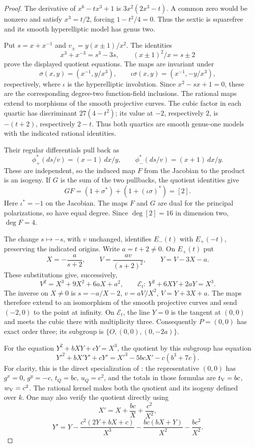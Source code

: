 \documentclass[11pt]{article}
\theoremstyle{definition}
\theoremstyle{remark}
\begin{document}
\begin{proof}
The derivative of \(x^6-tx^3+1\) is \(3x^2(2x^3-t)\).
A common zero would be nonzero and satisfy \(x^3=t/2\), forcing
\(1-t^2/4=0\). Thus the sextic is squarefree and its smooth
hyperelliptic model has genus two.

Put \(s=x+x^{-1}\) and \(v_\pm=y(x\pm1)/x^2\).
The identities
\[
 x^3+x^{-3}=s^3-3s,\qquad (x\pm1)^2/x=s\pm2
\]
prove the displayed quotient equations. The maps are invariant under
\[
 \sigma(x,y)=(x^{-1},y/x^3),\qquad
 \iota\sigma(x,y)=(x^{-1},-y/x^3),
\]
respectively, where \(\iota\) is the hyperelliptic involution.
Since \(x^2-sx+1=0\), these are the corresponding degree-two
function-field inclusions. The rational maps extend to morphisms of
the smooth projective curves. The cubic factor in each quartic has
discriminant \(27(4-t^2)\); its value at \(-2\), respectively \(2\),
is \(-(t+2)\), respectively \(2-t\). Thus both quartics are
smooth genus-one models with the indicated rational identities.

Their regular differentials pull back as
\[
 \phi_+^*(ds/v)=(x-1)\,dx/y,\qquad
 \phi_-^*(ds/v)=(x+1)\,dx/y.
\]
These are independent, so the induced map \(F\) from the Jacobian to
the product is an isogeny. If \(G\) is the sum of the two pullbacks,
the quotient identities give
\[
 GF=(1+\sigma^*)+(1+(\iota\sigma)^*)=[2].
\]
Here \(\iota^*=-1\) on the Jacobian. The maps \(F\) and \(G\)
are dual for the principal polarizations, so have equal degree.
Since \(\deg[2]=16\) in dimension two, \(\deg F=4\).

The change \(s\mapsto-s\), with \(v\) unchanged, identifies
\(E_-(t)\) with \(E_+(-t)\), preserving the indicated origins.
Write \(a=t+2\ne0\). On \(E_+(t)\) put
\[
 X=-\frac{a}{s+2},\qquad
 V=\frac{av}{(s+2)^2},\qquad Y=V-3X-a.
\]
These substitutions give, successively,
\[
 V^2=X^3+9X^2+6aX+a^2,\qquad
 \mathcal E_t:\ Y^2+6XY+2aY=X^3.
\]
The inverse on \(X\ne0\) is
\(s=-a/X-2\), \(v=aV/X^2\), \(V=Y+3X+a\).
The maps therefore extend to an isomorphism of the smooth projective
curves and send \((-2,0)\) to the point at infinity.
On \(\mathcal E_t\), the line \(Y=0\) is the tangent at
\((0,0)\) and meets the cubic there with multiplicity three.
Consequently \(P=(0,0)\) has exact order three; its subgroup is
\(\{O,(0,0),(0,-2a)\}\).

For the equation \(Y^2+bXY+cY=X^3\), the quotient by this subgroup
has equation
\[
 Y'^2+bX'Y'+cY'=X'^3-5bcX'-c(b^3+7c).
\]
For clarity, this is the direct specialization of
\citet[translated pp.~3--4, equations~(8)--(11)]{Velu1971}:
the representative \((0,0)\) has
\(g^x=0\), \(g^y=-c\), \(t_Q=bc\), \(u_Q=c^2\), and
the totals in those formulas are \(t_{\rm V}=bc\), \(w_{\rm V}=c^2\).
The rational kernel makes both the quotient and its isogeny defined
over \(k\). One may also verify the quotient directly using
\[
 X'=X+\frac{bc}{X}+\frac{c^2}{X^2},
\]
\[
 Y'=Y-\frac{c^2(2Y+bX+c)}{X^3}
        -\frac{bc(bX+Y)}{X^2}-\frac{bc^2}{X^2}.
\]


\end{proof}
\end{document}
